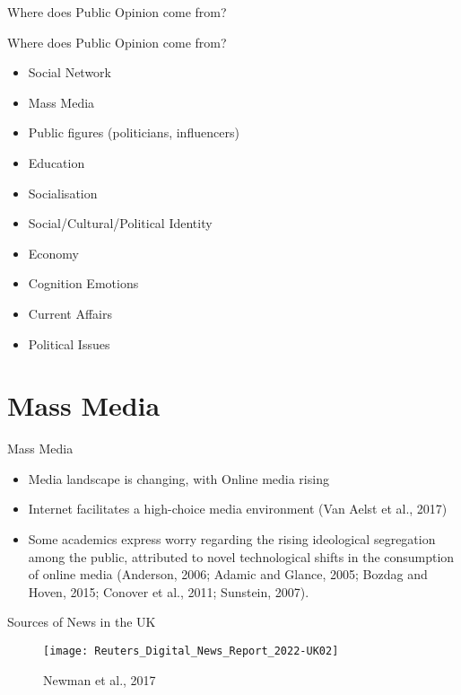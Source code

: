 \documentclass{beamer}
\begin{document}
\begin{frame}{Where does Public Opinion come from?}
\end{frame}

\begin{frame}{Where does Public Opinion come from?}
    \begin{itemize}
        \item Social Network 
        \item Mass Media 
        \item Public figures (politicians, influencers) 
        \item Education 
        \item Socialisation
        \item Social/Cultural/Political Identity 
        \item Economy 
        \item Cognition 
        \itme Emotions 
        \item Current Affairs 
        \item Political Issues 
    \end{itemize} 
\end{frame}







\section{Mass Media}

\begin{frame}{Mass Media}
\begin{itemize}
    \item Media landscape is changing, with Online media rising 
    \item Internet facilitates a high-choice media environment (Van Aelst et al., 2017)
    \item Some academics express worry regarding the rising ideological segregation among the public, attributed to novel technological shifts in the consumption of online media (Anderson, 2006; Adamic and Glance, 2005; Bozdag and Hoven, 2015; Conover et al., 2011; Sunstein, 2007).
\end{itemize}
\end{frame}

\begin{frame}{Sources of News in the UK}
    \begin{figure}
        \centering
        \texttt{[image: Reuters\_Digital\_News\_Report\_2022-UK02]}
        \caption{Newman et al., 2017}
        \label{fig:1}
    \end{figure}
\end{frame}
\end{document}
